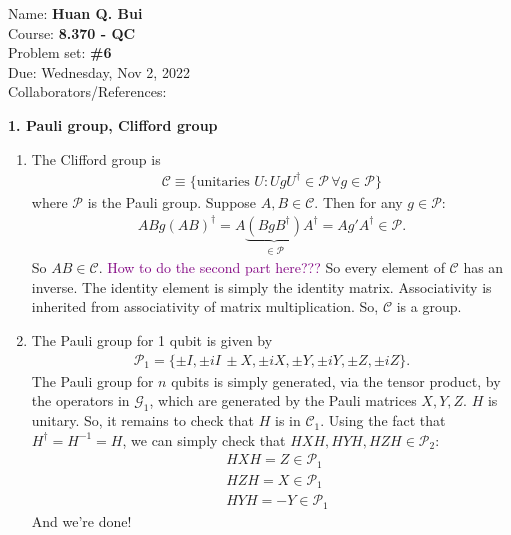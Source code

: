 \documentclass{article}
\theoremstyle{definition}
\begin{document}
\begin{framed}
\noindent Name: \textbf{Huan Q. Bui}\\
Course: \textbf{8.370 - QC}\\
Problem set: \textbf{\#6}\\
Due: Wednesday, Nov 2, 2022\\
Collaborators/References: 
\end{framed}


\noindent \textbf{1. Pauli group, Clifford group} 

\begin{enumerate}[label=(\alph*)]
	\item The Clifford group is 
	\begin{align*}
		\mathcal{C} \equiv \{ \text{unitaries } U : U g U^\dagger \in \mathcal{P}\, \forall g \in \mathcal{P}     \}
	\end{align*}
where $\mathcal{P}$ is the Pauli group. Suppose $A,B\in \mathcal{C}$. Then for any $g\in \mathcal{P}$:
\begin{align*}
	AB g (AB)^\dagger =  A \underbrace{ (BgB^\dagger)}_{\in \mathcal{P}} A^\dagger= A g' A^\dagger \in \mathcal{P}.
\end{align*}
So $AB\in \mathcal{C}$. \textcolor{purple}{How to do the second part here???}
So every element of $\mathcal{C}$ has an inverse. The identity element is simply the identity matrix. Associativity is inherited from associativity of matrix multiplication. So, $\mathcal{C}$ is a group. 
	
	\item The Pauli group for 1 qubit is given by 
	\begin{align*}
		\mathcal{P}_1 = \{ \pm I, \pm iI\,\pm X, \pm iX, \pm Y, \pm i Y, \pm Z, \pm iZ \}.
	\end{align*}
	The Pauli group for $n$ qubits is simply generated, via the tensor product, by the operators in $\mathcal{G}_1$, which are generated by the Pauli matrices $X,Y,Z$. $H$ is unitary. So, it remains to check that $H$ is in $\mathcal{C}_1$. Using the fact that $H^\dagger = H^{-1} = H$, we can simply check that $HXH, HYH, HZH \in \mathcal{P}_2$:
	\begin{align*}
		&HXH = Z \in \mathcal{P}_1 \\
		&HZH = X \in \mathcal{P}_1 \\
		&HYH = -Y \in \mathcal{P}_1
	\end{align*}
	And we're done!
	

\end{enumerate}
\end{document}
